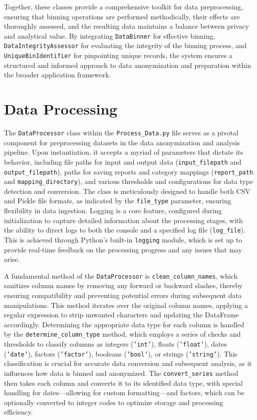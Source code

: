 \documentclass{article}
\begin{document}
Together, these classes provide a comprehensive toolkit for data preprocessing, ensuring that binning operations are performed methodically, their effects are thoroughly assessed, and the resulting data maintains a balance between privacy and analytical value. By integrating \texttt{DataBinner} for effective binning, \texttt{DataIntegrityAssessor} for evaluating the integrity of the binning process, and \texttt{UniqueBinIdentifier} for pinpointing unique records, the system ensures a structured and informed approach to data anonymization and preparation within the broader application framework.

\section*{Data Processing}
The \texttt{DataProcessor} class within the \texttt{Process\_Data.py} file serves as a pivotal component for preprocessing datasets in the data anonymization and analysis pipeline. Upon instantiation, it accepts a myriad of parameters that dictate its behavior, including file paths for input and output data (\texttt{input\_filepath} and \texttt{output\_filepath}), paths for saving reports and category mappings (\texttt{report\_path} and \texttt{mapping\_directory}), and various thresholds and configurations for data type detection and conversion. The class is meticulously designed to handle both CSV and Pickle file formats, as indicated by the \texttt{file\_type} parameter, ensuring flexibility in data ingestion. Logging is a core feature, configured during initialization to capture detailed information about the processing stages, with the ability to direct logs to both the console and a specified log file (\texttt{log\_file}). This is achieved through Python's built-in \texttt{logging} module, which is set up to provide real-time feedback on the processing progress and any issues that may arise.

A fundamental method of the \texttt{DataProcessor} is \texttt{clean\_column\_names}, which sanitizes column names by removing any forward or backward slashes, thereby ensuring compatibility and preventing potential errors during subsequent data manipulations. This method iterates over the original column names, applying a regular expression to strip unwanted characters and updating the DataFrame accordingly. Determining the appropriate data type for each column is handled by the \texttt{determine\_column\_type} method, which employs a series of checks and thresholds to classify columns as integers (\texttt{'int'}), floats (\texttt{'float'}), dates (\texttt{'date'}), factors (\texttt{'factor'}), booleans (\texttt{'bool'}), or strings (\texttt{'string'}). This classification is crucial for accurate data conversion and subsequent analysis, as it influences how data is binned and anonymized. The \texttt{convert\_series} method then takes each column and converts it to its identified data type, with special handling for dates—allowing for custom formatting—and factors, which can be optionally converted to integer codes to optimize storage and processing efficiency.
\end{document}
